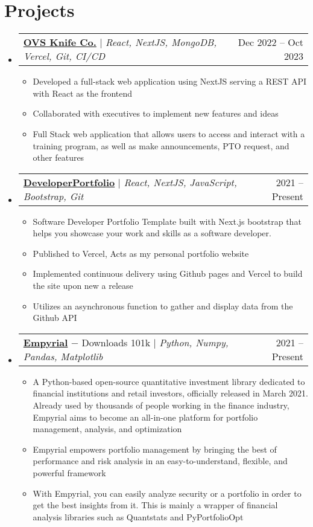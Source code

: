 \documentclass[letterpaper,11pt]{article}
\makeatletter
\newcommand{\resumeItem}[1]{
  \item\small{
    {#1 \vspace{-2pt}}
  }
}
\newcommand{\resumeProjectHeading}[2]{
    \item
    \begin{tabular*}{0.97\textwidth}{l@{\extracolsep{\fill}}r}
      \small#1 & #2 \\
    \end{tabular*}\vspace{-5pt}
}
\newcommand{\resumeSubHeadingListStart}{\begin{itemize}[leftmargin=0.15in, label={}]}
\newcommand{\resumeSubHeadingListEnd}{\end{itemize}}
\newcommand{\resumeItemListStart}{\begin{itemize}}
\newcommand{\resumeItemListEnd}{\end{itemize}\vspace{-4pt}}
\makeatother
\begin{document}
\section{Projects}
    \resumeSubHeadingListStart
      \resumeProjectHeading
          {\textbf{\href{https://ovsknife.com/home}{OVS Knife Co.}} $|$ \emph{React, NextJS, MongoDB, Vercel, Git, CI/CD}}{Dec 2022 -- Oct 2023}
          \resumeItemListStart
            \resumeItem{Developed a full-stack web application using NextJS serving a REST API with React as the frontend}
            \resumeItem{Collaborated with executives to implement new features and ideas}
            \resumeItem{Full Stack web application that allows users to access and interact with a training program, as well as make announcements, PTO request, and other features}
          \resumeItemListEnd
      \resumeProjectHeading
          {\textbf{\href{https://dev-port-lac.vercel.app/}{DeveloperPortfolio}} $|$ \emph{React, NextJS, JavaScript, Bootstrap, Git}}{2021 -- Present}
          \resumeItemListStart
            \resumeItem{Software Developer Portfolio Template built with Next.js bootstrap that helps you showcase your work and skills as a software developer.}
            \resumeItem{Published to Vercel, Acts as my personal portfolio website}
            \resumeItem{Implemented continuous delivery using Github pages and Vercel to build the site upon new a release}
            \resumeItem{Utilizes an asynchronous function to gather and display data from the Github API}
          \resumeItemListEnd
      \resumeProjectHeading
          {\textbf{\href{https://github.com/ssantoshp/Empyrial}{Empyrial}} $-$ \emph{}{Downloads 101k} $|$ \emph{Python, Numpy, Pandas, Matplotlib}}{2021 -- Present}
          \resumeItemListStart
            \resumeItem{A Python-based open-source quantitative investment library dedicated to financial institutions and retail investors, officially released in March 2021. Already used by thousands of people working in the finance industry, Empyrial aims to become an all-in-one platform for portfolio management, analysis, and optimization}
            \resumeItem{Empyrial empowers portfolio management by bringing the best of performance and risk analysis in an easy-to-understand, flexible, and powerful framework}
            \resumeItem{With Empyrial, you can easily analyze security or a portfolio in order to get the best insights from it. This is mainly a wrapper of financial analysis libraries such as Quantstats and PyPortfolioOpt}
          \resumeItemListEnd
    \resumeSubHeadingListEnd
\end{document}
